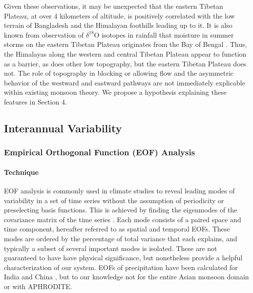 \documentclass[12pt]{article}
\begin{document}
	Given these observations, it may be unexpected that the eastern Tibetan Plateau, at over 4 kilometers of altitude, is positively correlated with the low terrain of Bangladesh and the Himalayan foothills leading up to it. It is also known from observation of $\delta^{18}$O isotopes in rainfall that moisture in summer storms on the eastern Tibetan Plateau originates from the Bay of Bengal \citep{Yao2009,Gao2011,Yang2011}. Thus, the Himalayas along the western and central Tibetan Plateau appear to function as a barrier, as does other low topography, but the eastern Tibetan Plateau does not. The role of topography in blocking or allowing flow and the asymmetric behavior of the westward and eastward pathways are not immediately explicable within existing monsoon theory. We propose a hypothesis explaining these features in Section 4.
	
\subsection{Interannual Variability}

\subsubsection{Empirical Orthogonal Function (EOF) Analysis}

\paragraph{Technique}

	EOF analysis is commonly used in climate studies to reveal leading modes of variability in a set of time series without the assumption of periodicity or preselecting basis functions. This is achieved by finding the eigenmodes of the covariance matrix of the time series \citep{Lorenz1956,Wilks2006}. Each mode consists of a paired space and time component, hereafter referred to as spatial and temporal EOFs. These modes are ordered by the percentage of total variance that each explains, and typically a subset of several important modes is isolated. These are not guaranteed to have have physical significance, but nonetheless provide a helpful characterization of our system. EOFs of precipitation have been calculated for India \citep{Krishnamurthy2000} and China \citep{Ding2008}, but to our knowledge not for the entire Asian monsoon domain or with APHRODITE. 
	
\end{document}

